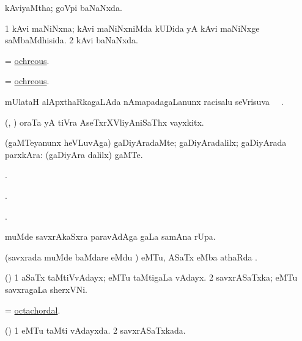 \bentry
{}
\gl{\gu}
\bmng
kAviyaMtha; goVpi baNaNxda. 
\emng
\eentry

\bentry
{}
\gl{\gu}
\bmng
\bnum
\num{1} kAvi maNiNxna; kAvi maNiNxniMda kUDida yA kAvi maNiNxge saMbaMdhisida. 
\num{2} kAvi baNaNxda. 
\enum
\emng
\eentry

\bentry
{}
\gl{\gu}
\bmng
= \hyperlink{ochreous}{ochreous}. 
\emng
\eentry

\bentry
{}
\gl{\gu}
\bmng
= \hyperlink{ochreous}{ochreous}. 
\emng
\eentry

\bentry
{}
\gl{\uparx}
\bmng
mUlataH alApxthaRkagaLAda nAmapadagaLanunx racisalu seVrisuva \uparx\ \udA\ . 
\emng
\eentry

\bentry
{}
\gl{\nA}
\bmng
(\AseTxrXV, \ashi) oraTa yA tiVra AseTxrXVliyAniSaThx vayxkitx. 
\emng
\eentry

\bentry
{}
\gl{\kirxvi}
\bmng
(gaMTeyanunx heVLuvAga) gaDiyAradaMte; gaDiyAradalilx; gaDiyArada parxkAra:  (gaDiyAra dalilx)  gaMTe. 
\emng
\eentry

\bentry
{}
\gl{\saMkiSx}
\bmng
{}. 
\emng
\eentry

\bentry
{}
\gl{\saMkiSx}
\bmng
{}. 
\emng
\eentry

\bentry
{}
\gl{\saMkiSx}
\bmng
{}. 
\emng
\eentry

\bentry
{}
\gl{\sapUpa}
\bmng
muMde savxrAkaSxra paravAdAga  \sapUpa gaLa samAna rUpa. 
\emng
\eentry

\bentry
{}
\gl{\sapUpa}
\bmng
(savxrada muMde baMdare  eMdu \parx) eMTu, ASaTx eMba athaRda \sapUpa. 
\emng
\eentry

\bentry
{}
\gl{\nA}
\bmng
(\saM) 
\bnum
\num{1} aSaTx taMtiVvAdayx; eMTu taMtigaLa vAdayx. 
\num{2} savxrASaTxka; eMTu savxragaLa sherxVNi. 
\enum
\emng
\eentry

\bentry
{}
\gl{\gu}
\bmng
= \hyperlink{octachordal}{octachordal}. 
\emng
\eentry

\bentry
{}
\gl{\gu}
\bmng
(\saM) 
\bnum
\num{1} eMTu taMti vAdayxda. 
\num{2} savxrASaTxkada. 
\enum
\emng
\eentry

